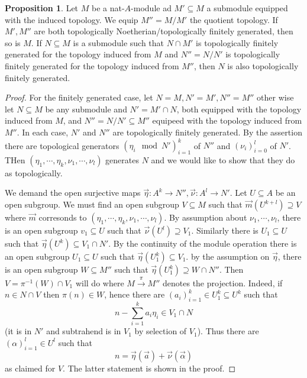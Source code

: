 \documentclass[10pt]{article}
\numberwithin{equation}{section}
\theoremstyle{definition}
\newtheorem{proposition}{Proposition}[subsection]
\begin{document}
\begin{proposition}
    \label{proposition_27_1}
    Let $M$ be a nat-$A$-module ad $M'\subseteq M$ a submodule equipped with the induced topology. We equip $M''=M/M'$ the quotient topology. If $M',M''$ are both topologically Noetherian/topologically finitely generated, then so is $M$. If $N\subseteq M$ is a submodule such that $N\cap M'$ is topologically finitely generated for the topology induced from $M$ and $N''=N/N'$ is topologically finitely generated for the topology induced from $M''$, then $N$ is also topologically finitely generated.
\end{proposition}
\begin{proof}
    For the finitely generated case, let $N=M,N'=M',N''=M''$ other wise let $N\subseteq M$ be any submodule and $N' = M'\cap N$, both equipped with the topology induced from $M$, and $N''=N/N'\subseteq M''$ equipeed with the topology induced from $M''$. In each case, $N'$ and $N''$ are topologically finitely generated. 
    By the assertion there are topological generators $(\eta_i\mod{N'})_{i=1}^k$ of $N''$ and $(\nu_i)_{i=0}^l$ of $N'$. THen $(\eta_1,\cdots,\eta_k,\nu_1,\cdots,\nu_l)$ generates $N$ and we would like to show that they do as topologically.
    \par We demand the open surjective maps $\vec{\eta}:A^k\to N'',\vec{\nu}:A^l\to N'$. Let $U\subseteq A$ be an open subgroup. We must find an open subgroup $V\subseteq M$ such that $\vec{m}(U^{k+l}) \supseteq V$ where $\vec{m}$ corresonds to $(\eta_1,\cdots,\eta_k,\nu_1,\cdots,\nu_l)$. 
    By assumption about $\nu_1,\cdots,\nu_l$, there is an open subgroup $v_1\subseteq U$ such that $\vec{\nu}(U^l)\supseteq V_1$. Similarly there is $U_1\subseteq U$ such that $\vec{\eta}(U^k)\subseteq V_1\cap N'$. By the continuity of the module operation there is an open subgroup $U_1\subseteq U$ such that $\vec{\eta}(U_1^k)\subseteq V_1$. 
    by the assumption on $\vec{\eta}$, there is an open subgroup $W\subseteq M''$ such that $\vec{\eta}(U_1^k)\supseteq W\cap N''$. Then $V= \pi^{-1}(W)\cap V_1$ will do where $M\stackrel{\pi}{\to}M''$ denotes the projection. Indeed, if $n\in N\cap V$ then $\pi(n)\in W$, hence there are $(a_i)_{i=1}^k\in U_1^k\subseteq U^k$ such that 
    \begin{equation*}
        n- \sum_{i=1}^ka_i\eta_i\in V_1\cap N
    \end{equation*}
    (it is in $N'$ and subtrahend is in $V_1$ by selection of $V_1$). Thus there are $(\alpha)_{i=1}^l\in U^l$ such that 
    \begin{equation*}
        n = \vec{\eta}(\vec{a})+\vec{\nu}(\vec{\alpha})
    \end{equation*}
    as claimed for $V$. The latter statement is shown in the proof.
\end{proof}
\end{document}
